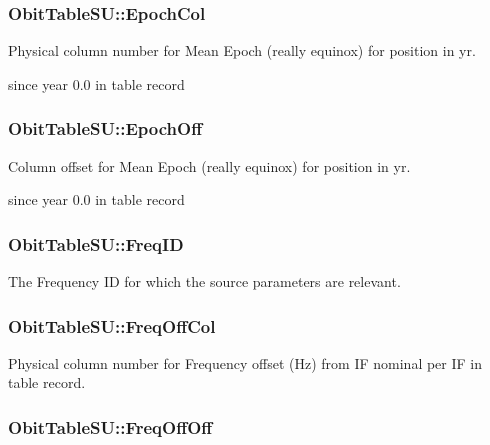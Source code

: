 \subsubsection{ {\bf Obit\-Table\-SU::Epoch\-Col}}\label{structObitTableSU_o30}


Physical column number for Mean Epoch (really equinox) for position in yr. 

since year 0.0 in table record 
\subsubsection{ {\bf Obit\-Table\-SU::Epoch\-Off}}\label{structObitTableSU_o29}


Column offset for Mean Epoch (really equinox) for position in yr. 

since year 0.0 in table record 
\subsubsection{ {\bf Obit\-Table\-SU::Freq\-ID}}\label{structObitTableSU_o18}


The Frequency ID for which the source parameters are relevant. 

\subsubsection{ {\bf Obit\-Table\-SU::Freq\-Off\-Col}}\label{structObitTableSU_o52}


Physical column number for Frequency offset (Hz) from IF nominal per IF in table record. 

\subsubsection{ {\bf Obit\-Table\-SU::Freq\-Off\-Off}}\label{structObitTableSU_o51}


